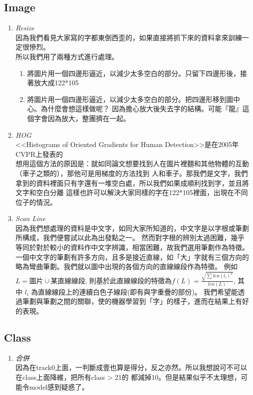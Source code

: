 \documentclass[12pt]{article}
\theoremstyle{definition}
\theoremstyle{remark}
\begin{document}
\subsection{Image}
\begin{enumerate}
  \item \large{\em \color{red}Resize\/}\\
    因為我們看見大家寫的字都東倒西歪的，如果直接將抓下來的資料拿來訓練一定很慘烈。\\
    所以我們用了兩種方式進行處理。
    \begin{enumerate}
      \item 將圖片用一個四邊形逼近，以減少太多空白的部分。只留下四邊形後，接著放大成122*105
      \item 將圖片用一個四邊形逼近，以減少太多空白的部分。把四邊形移到圖中心。為什麼會想這樣做呢？
        因為擔心放大後失去字的結構。可能『龍』這個字會因為放大，整團擠在一起。
    \end{enumerate}
  \item \large{\em \color{red}HOG\/}\\
    <<Histograms of Oriented Gradients for Human Detection>>是在2005年CVPR上發表的\\
    想用這個方法的原因是：就如同論文想要找到人在圖片裡麵和其他物體的互動（車子之類的），那他可是用梯度的方法找到
    人和車子。那我們是文字，我們拿到的資料裡面只有字還有一堆空白處，所以我們如果成順利找到字，並且將文字和空白分離
    這樣也許可以解決大家同樣的字在122*105裡面，出現在不同位子的情況。
  \item \large{\em \color{red}Scan Line\/}\\
    因為我們想處理的資料是中文字，如同大家所知道的，中文字是以字根或筆劃所構成，我們便嘗試以此為出發點之一。
    然而對字根的辨別太過困難，幾乎等同於對於較小的資料作中文字辨識，相當困難，故我們選用筆劃作為特徵。
    一個中文字的筆劃有許多方向，且多是接近直線，如「大」字就有三個方向的略為彎曲筆劃。我們就以圖中出現的各個方向的直線線段作為特徵。
    例如 $L = \text{圖片} \cup \text{某直線線段}$, 則基於此直線線段的特徵為$f(L) = \frac{\sqrt{\sum len(l_i)^2}}{len(L)}$, 其中 $l_i$ 為直線線段上的連續白色子線段(即有與字重疊的部份)。
    我們希望能透過筆劃與筆劃之間的關聯，使的機器學習到「字」的樣子，進而在結果上有好的表現。
\end{enumerate}
\subsection{Class}
\begin{enumerate}
  \item \large{\em \color{red}合併\/}\\
    因為在track0上面，一判斷成壹也算是得分，反之亦然。所以我想說可不可以在class上面降維，把所有class > 21的
    都減掉10。但是結果似乎不太理想，可能令model感到疑惑了。
\end{enumerate}
\end{document}
